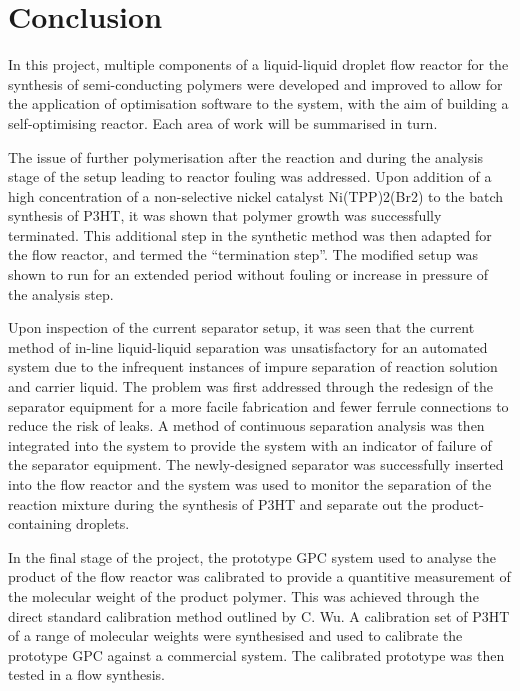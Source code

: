\chapter{Conclusion}

In this project, multiple components of a liquid-liquid droplet flow reactor for the synthesis of semi-conducting polymers were developed and improved to allow for the application of optimisation software to the system, with the aim of building a self-optimising reactor.  Each area of work will be summarised in turn.

The issue of further polymerisation after the reaction and during the analysis stage of the setup leading to reactor fouling was addressed. Upon addition of a high concentration of a non-selective nickel catalyst Ni(TPP)2(Br2) to the batch synthesis of P3HT, it was shown that polymer growth was successfully terminated. This additional step in the synthetic method was then adapted for the flow reactor, and termed the “termination step”. The modified setup was shown to run for an extended period without fouling or increase in pressure of the analysis step.

Upon inspection of the current separator setup, it was seen that the current method of in-line liquid-liquid separation was unsatisfactory for an automated system due to the infrequent instances of impure separation of reaction solution and carrier liquid. The problem was first addressed through the redesign of the separator equipment for a more facile fabrication and fewer ferrule connections to reduce the risk of leaks. A method of continuous separation analysis was then integrated into the system to provide the system with an indicator of failure of the separator equipment. The newly-designed separator was successfully inserted into the flow reactor and the system was used to monitor the separation of the reaction mixture during the synthesis of P3HT and separate out the product-containing droplets.

In the final stage of the project, the prototype GPC system used to analyse the product of the flow reactor was calibrated to provide a quantitive measurement of the molecular weight of the product polymer. This was achieved through the direct standard calibration method outlined by C. Wu. A calibration set of P3HT of a range of molecular weights were synthesised and used to calibrate the prototype GPC against a commercial system. The calibrated prototype was then tested in a flow synthesis.

